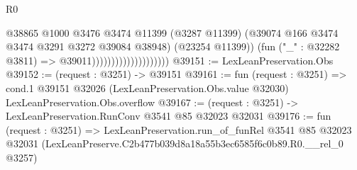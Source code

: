 \begin{lexlean}{R0}
\begin{coremodule}
                                          @38865
                                            @1000
                                            @3476
                                            @3474
                                            @11399
                                            (@3287 @11399)
                                            (@39074 @166 @3474 @3474 @3291 @3272 @39084 @38948)
                                            (@23254 @11399))
                                          (fun ("_" : @32282 @3811) => @39011))))))))))))))))))))
@39151 := LexLeanPreservation.Obs
@39152 := (request : @3251) -> @39151
@39161 := fun (request : @3251) =>
  cond.{1} @39151 @32026 (LexLeanPreservation.Obs.value @32030) LexLeanPreservation.Obs.overflow
@39167 := (request : @3251) -> LexLeanPreservation.RunConv @3541 @85 @32023 @32031
@39176 := fun (request : @3251) =>
  LexLeanPreservation.run_of_funRel
    @3541
    @85
    @32023
    @32031
    (LexLeanPreserve.C2b477b039d8a18a55b3ec6585f6c0b89.R0.__rel_0 @3257)
\end{coremodule}
\end{lexlean}
